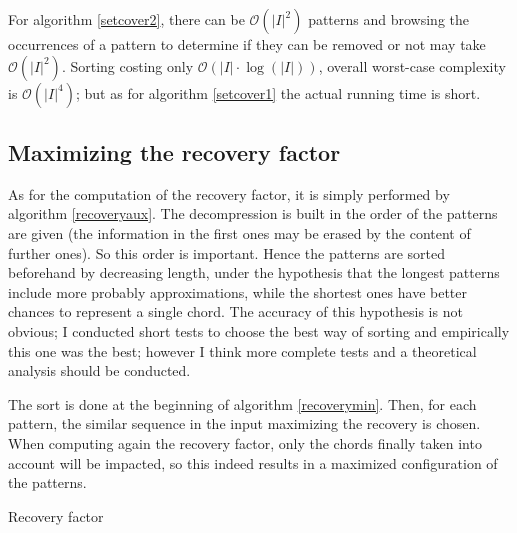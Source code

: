 \documentclass[a4paper,10pt]{article}
\newcommand{\bigO}[1]{\mathcal O\left( #1 \right)}
\begin{document}
For algorithm \ref{setcover2}, there can be $\bigO{|I|^2}$ patterns and browsing the occurrences of a pattern to determine if they can be removed or not may take $\bigO{|I|^2}$. Sorting costing only $\bigO{|I|\cdot\log(|I|)}$, overall worst-case complexity is $\bigO{|I|^4}$; but as for algorithm \ref{setcover1} the actual running time is short.


\subsection*{Maximizing the recovery factor}

As for the computation of the recovery factor, it is simply performed by algorithm \ref{recoveryaux}. The decompression is built in the order of the patterns are given (the information in the first ones may be erased by the content of further ones). So this order is important. Hence the patterns are sorted beforehand by decreasing length, under the hypothesis that the longest patterns include more probably approximations, while the shortest ones have better chances to represent a single chord. The accuracy of this hypothesis is not obvious; I conducted short tests to choose the best way of sorting and empirically this one was the best; however I think more complete tests and a theoretical analysis should be conducted.

The sort is done at the beginning of algorithm \ref{recoverymin}. Then, for each pattern, the similar sequence in the input maximizing the recovery is chosen. When computing again the recovery factor, only the chords finally taken into account will be impacted, so this indeed results in a maximized configuration of the patterns.

\begin{algorithm}
\caption{Recovery factor \label{recoveryaux}}
 
     
  


\end{algorithm}
\end{document}
